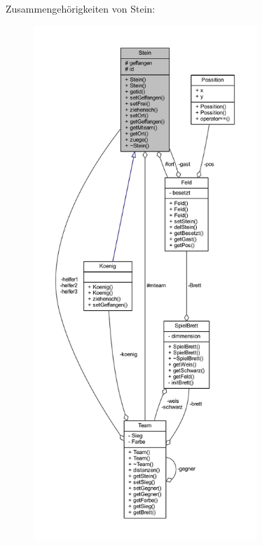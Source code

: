 Zusammengehörigkeiten von Stein\+:\nopagebreak
\begin{figure}[H]
\begin{center}
\leavevmode
\includegraphics[height=550pt]{class_stein__coll__graph}
\end{center}
\end{figure}
